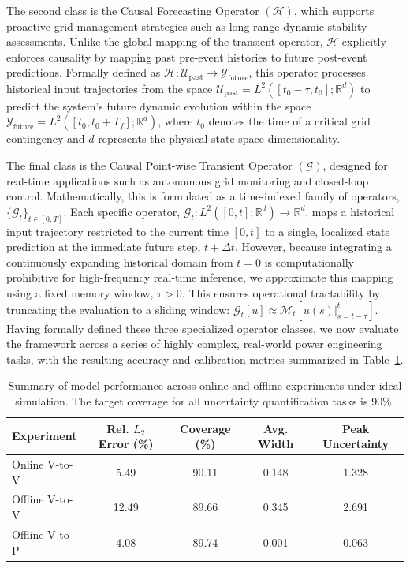 \documentclass{iopjournal}
\begin{document}
The second class is the Causal Forecasting Operator $(\mathcal H)$, which supports proactive grid management strategies such as long-range dynamic stability assessments. Unlike the global mapping of the transient operator, $\mathcal H$ explicitly enforces causality by mapping past pre-event histories to future post-event predictions. Formally defined as $\mathcal H: \mathcal U_\mathrm{past} \to \mathcal Y_\mathrm{future}$, this operator processes historical input trajectories from the space $\mathcal{U}_{\text{past}} = L^2([t_0 - \tau, t_0]; \mathbb{R}^d)$ to predict the system's future dynamic evolution within the space $\mathcal{Y}_{\text{future}} = L^2([t_0, t_0 + T_f]; \mathbb{R}^d)$, where $t_0$ denotes the time of a critical grid contingency and $d$ represents the physical state-space dimensionality.

The final class is the Causal Point-wise Transient Operator $(\mathcal G)$, designed for real-time applications such as autonomous grid monitoring and closed-loop control. Mathematically, this is formulated as a time-indexed family of operators, $\{\mathcal{G}_t\}_{t \in [0,T]}$. Each specific operator, $\mathcal{G}_t : L^2([0,t]; \mathbb{R}^d) \to \mathbb{R}^d$, maps a historical input trajectory restricted to the current time $[0,t]$ to a single, localized state prediction at the immediate future step, $t + \Delta t$. However, because integrating a continuously expanding historical domain from $t=0$ is computationally prohibitive for high-frequency real-time inference, we approximate this mapping using a fixed memory window, $\tau > 0$. This ensures operational tractability by truncating the evaluation to a sliding window: $\mathcal{G}_t[u] \approx \mathcal{M}_t\left[u(s)\big|_{s = t-\tau}^t\right]$. Having formally defined these three specialized operator classes, we now evaluate the framework across a series of highly complex, real-world power engineering tasks, with the resulting accuracy and calibration metrics summarized in Table~\ref{tab:results_summary_all}.

\begin{table}[t]

\caption{Summary of model performance across online and offline experiments under ideal simulation. The target coverage for all uncertainty quantification tasks is 90\%.}
\label{tab:results_summary_all}

\begin{center}
\begin{tabular}{lcccc}
\hline
\textbf{Experiment} & \textbf{Rel. $L_2$ Error (\%)} & \textbf{Coverage (\%)} & \textbf{Avg. Width} & \textbf{Peak Uncertainty} \\
\hline

Online V-to-V  & 5.49  & 90.11 & 0.148 & 1.328 \\
Offline V-to-V & 12.49 & 89.66 & 0.345 & 2.691 \\
Offline V-to-P & 4.08  & 89.74 & 0.001 & 0.063 \\

\hline
\end{tabular}
\end{center}

\end{table}
\end{document}
